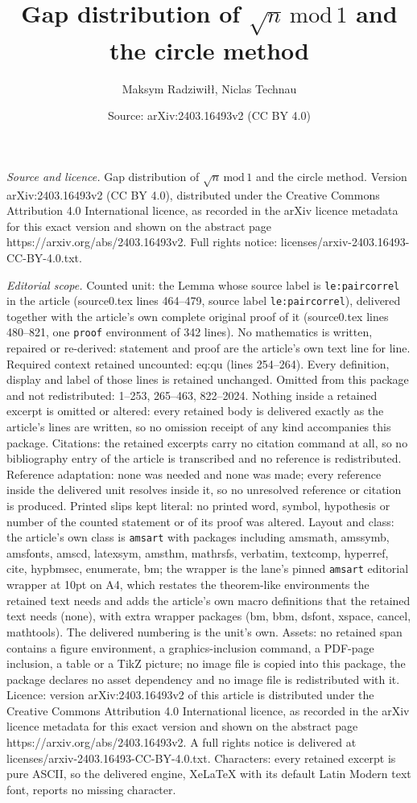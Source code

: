 \documentclass[10pt,a4paper]{amsart}
\title[Gap distribution of $\sqrt{n} \,\mathrm{mod}\, 1$ and the ci]{Gap distribution of $\sqrt{n} \,\mathrm{mod}\, 1$ and the circle method}
\author{Maksym Radziwi{\l}{\l}, Niclas Technau}
\date{Source: arXiv:2403.16493v2 (CC BY 4.0)}
\begin{document}
\maketitle

\noindent\emph{Source and licence.} Gap distribution of $\sqrt{n} \,\mathrm{mod}\, 1$ and the circle method. Version arXiv:2403.16493v2 (CC BY 4.0), distributed under the Creative Commons Attribution 4.0 International licence, as recorded in the arXiv licence metadata for this exact version and shown on the abstract page https://arxiv.org/abs/2403.16493v2. Full rights notice: licenses/arxiv-2403.16493-CC-BY-4.0.txt.\par\smallskip

\noindent\textit{Editorial scope.} Counted unit: the Lemma whose source label is \texttt{le:paircorrel} in the article (source0.tex lines 464--479, source label \texttt{le:paircorrel}), delivered together with the article's own complete original proof of it (source0.tex lines 480--821, one \texttt{proof} environment of 342 lines). No mathematics is written, repaired or re-derived: statement and proof are the article's own text line for line. Required context retained uncounted: eq:qu (lines 254--264). Every definition, display and label of those lines is retained unchanged. Omitted from this package and not redistributed: 1--253, 265--463, 822--2024. Nothing inside a retained excerpt is omitted or altered: every retained body is delivered exactly as the article's lines are written, so no omission receipt of any kind accompanies this package. Citations: the retained excerpts carry no citation command at all, so no bibliography entry of the article is transcribed and no reference is redistributed. Reference adaptation: none was needed and none was made; every reference inside the delivered unit resolves inside it, so no unresolved reference or citation is produced. Printed slips kept literal: no printed word, symbol, hypothesis or number of the counted statement or of its proof was altered. Layout and class: the article's own class is \texttt{amsart} with packages including amsmath, amssymb, amsfonts, amscd, latexsym, amsthm, mathrsfs, verbatim, textcomp, hyperref, cite, hypbmsec, enumerate, bm; the wrapper is the lane's pinned \texttt{amsart} editorial wrapper at 10pt on A4, which restates the theorem-like environments the retained text needs and adds the article's own macro definitions that the retained text needs (none), with extra wrapper packages (bm, bbm, dsfont, xspace, cancel, mathtools). The delivered numbering is the unit's own. Assets: no retained span contains a figure environment, a graphics-inclusion command, a PDF-page inclusion, a table or a TikZ picture; no image file is copied into this package, the package declares no asset dependency and no image file is redistributed with it. Licence: version arXiv:2403.16493v2 of this article is distributed under the Creative Commons Attribution 4.0 International licence, as recorded in the arXiv licence metadata for this exact version and shown on the abstract page https://arxiv.org/abs/2403.16493v2. A full rights notice is delivered at licenses/arxiv-2403.16493-CC-BY-4.0.txt. Characters: every retained excerpt is pure ASCII, so the delivered engine, XeLaTeX with its default Latin Modern text font, reports no missing character.
\end{document}
